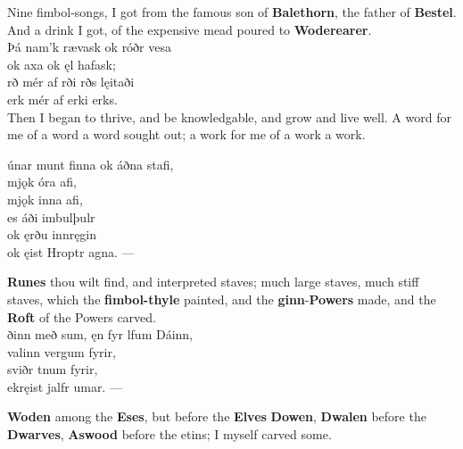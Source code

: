 \bvb Nine fimbol-songs, I got from the famous son of \textbf{Balethorn}, the father of \textbf{Bestel}. And a drink I got, of the expensive mead poured to \textbf{Woderearer}. \\

\bva Þá nam'k rævask \hld ok róðr vesa \\%
\ind ok axa ok ęl hafask; \\%
rð mér af rði \hld {}rðs lęitaði \\%
\ind {}erk mér af erki erks.\\%

\bvb Then I began to thrive, and be knowledgable, and grow and live well. A word for me of a word a word sought out; a work for me of a work a work\footnotemark[10]. \\

\bva {}únar munt finna \hld ok áðna stafi, \\%
\ind mjǫk óra afi, \\%
\ind mjǫk inna afi, \\%
\ind es áði imbulþulr \\%
\ind ok ęrðu innręgin \\%
\ind ok ęist Hroptr agna\footnotemark[5]. —\\%

\bvb \textbf{Runes} thou wilt find, and interpreted staves; much large staves, much stiff staves, which the \textbf{fimbol-thyle} painted, and the \textbf{ginn}-\textbf{Powers} made, and the \textbf{Roft} of the Powers carved. \\

\bva {}ðinn með sum, \hld ęn fyr lfum Dáinn, \\%
\ind {}valinn vergum fyrir, \\%
\ind {}sviðr tnum fyrir, \\%
ek\footnotemark[10] ręist jalfr umar. —\\%

\bvb \textbf{Woden} among the \textbf{Eses}, but before the \textbf{Elves} \textbf{Dowen}, \textbf{Dwalen} before the \textbf{Dwarves}, \textbf{Aswood} before the etins; I myself carved some. \\

